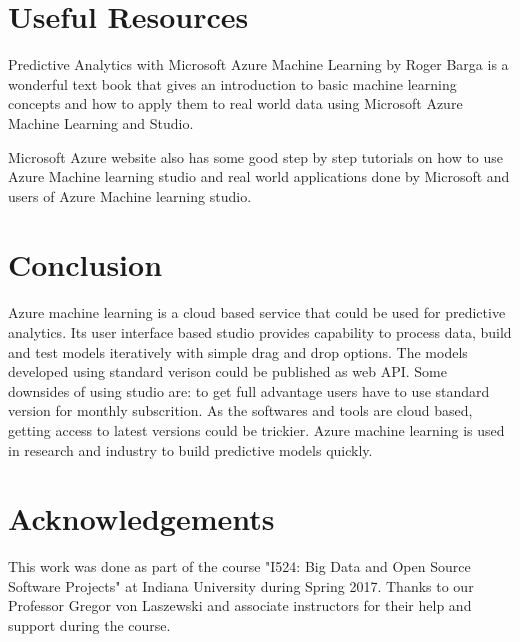 \documentclass[9pt,twocolumn,twoside]{styles/osajnl}
\begin{document}
\section{Useful Resources}

{Predictive Analytics with Microsoft Azure Machine Learning}
\cite{book-azureml} by Roger Barga is a wonderful text book that gives
an introduction to basic machine learning concepts and how to apply
them to real world data using Microsoft Azure Machine Learning and
Studio.

{Microsoft Azure website}\cite{www-azureMLSite} also has some good
step by step tutorials on how to use Azure Machine learning studio and
real world applications done by Microsoft and users of Azure Machine
learning studio.

\section{Conclusion}

Azure machine learning is a cloud based service that could be used for
predictive analytics. Its user interface based studio provides
capability to process data, build and test models iteratively with
simple drag and drop options. The models developed using standard
verison could be published as web API. Some downsides of using studio
are: to get full advantage users have to use standard version for
monthly subscrition. As the softwares and tools are cloud based,
getting access to latest versions could be trickier. Azure machine
learning is used in research and industry to build predictive models
quickly.


\section*{Acknowledgements}

This work was done as part of the course "I524: Big Data and Open
Source Software Projects" at Indiana University during Spring
2017. Thanks to our Professor Gregor von Laszewski and associate
instructors for their help and support during the course. 


\end{document}
